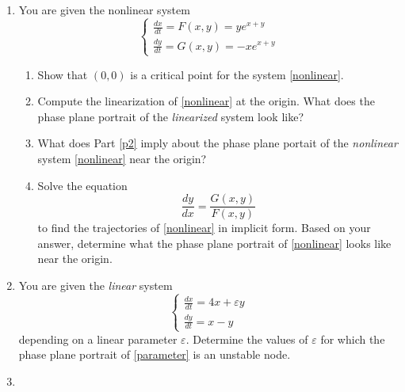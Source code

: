 \documentclass[11pt]{article}
\let\epsilon\varepsilon
\newcommand{\e}{\epsilon}
\begin{document}
\begin{enumerate}
\item You are given the nonlinear system
\begin{equation}
\begin{cases}\label{nonlinear}
    \frac {dx}{dt}=F(x,y)=ye^{x+y}\\
    \frac {dy}{dt}=G(x,y)=-xe^{x+y}
\end{cases}
\end{equation}
\begin{enumerate}    
    \item Show that $(0,0)$ is a critical point for the system \eqref{nonlinear}.
    \item \label{p2} Compute the linearization of \eqref{nonlinear} at the origin. What does the phase plane portrait of the \textit{linearized} system look like?
    \item What does Part \ref{p2} imply about the phase plane portait of the \textit{nonlinear} system \eqref{nonlinear} near the origin?
    \item Solve the equation 
    \begin{equation}
        \frac{dy}{dx}=\frac{G(x,y)}{F(x,y)}
    \end{equation}
    to find the trajectories of \eqref{nonlinear} in implicit form. Based on your answer, determine what the phase plane portrait of \eqref{nonlinear} looks like near the origin.
\end{enumerate}

\item You are given the \textit{linear} system 
\begin{equation}
    \begin{cases}\label{parameter}
    \frac {dx}{dt}=4x+\e y\\
    \frac {dy}{dt}=x-y
\end{cases}
\end{equation}
depending on a linear parameter $\e$.
Determine the values of $\e$ for which the phase plane portrait of \eqref{parameter} is an unstable node.


\item 


\end{enumerate}
\end{document}
